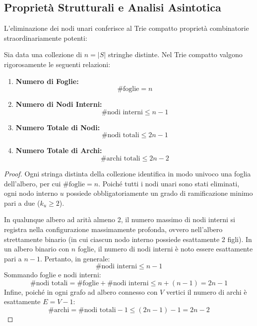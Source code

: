 \FloatBarrier
\subsection{Proprietà Strutturali e Analisi Asintotica}
\label{subsec:proprieta-strutturali-compacted}

L'eliminazione dei nodi unari conferisce al Trie compatto propriet\`a combinatorie straordinariamente potenti:

\begin{theorem}
\label{thm:proprieta-compacted-trie}
Sia data una collezione di $n = |S|$ stringhe distinte. Nel Trie compatto valgono rigorosamente le seguenti relazioni:
\begin{enumerate}
  \item \textbf{Numero di Foglie:}
  \begin{equation}
    \#\text{foglie} = n
  \end{equation}
  \item \textbf{Numero di Nodi Interni:}
  \begin{equation}
    \#\text{nodi interni} \le n - 1
  \end{equation}
  \item \textbf{Numero Totale di Nodi:}
  \begin{equation}
    \#\text{nodi totali} \le 2n - 1
  \end{equation}
  \item \textbf{Numero Totale di Archi:}
  \begin{equation}
    \#\text{archi totali} \le 2n - 2
  \end{equation}
\end{enumerate}
\end{theorem}

\begin{proof}
Ogni stringa distinta della collezione identifica in modo univoco una foglia dell'albero, per cui $\#\text{foglie} = n$. Poich\'e tutti i nodi unari sono stati eliminati, ogni nodo interno $u$ possiede obbligatoriamente un grado di ramificazione minimo pari a due ($k_u \ge 2$).

In qualunque albero ad arit\`a almeno 2, il numero massimo di nodi interni si registra nella configurazione massimamente profonda, ovvero nell'albero strettamente binario (in cui ciascun nodo interno possiede esattamente 2 figli). In un albero binario con $n$ foglie, il numero di nodi interni \`e noto essere esattamente pari a $n - 1$. Pertanto, in generale:
\begin{equation}
  \#\text{nodi interni} \le n - 1
\end{equation}
Sommando foglie e nodi interni:
\begin{equation}
  \#\text{nodi totali} = \#\text{foglie} + \#\text{nodi interni} \le n + (n - 1) = 2n - 1
\end{equation}
Infine, poich\'e in ogni grafo ad albero connesso con $V$ vertici il numero di archi \`e esattamente $E = V - 1$:
\begin{equation}
  \#\text{archi} = \#\text{nodi totali} - 1 \le (2n - 1) - 1 = 2n - 2
\end{equation}
\end{proof}

